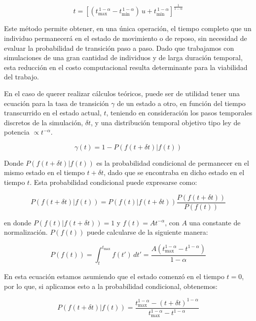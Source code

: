 \begin{equation}
    t = \left[(t_{\max}^{\,1-\alpha} - t_{\min}^{\,1-\alpha})\,u + t_{\min}^{\,1-\alpha}\right]^{\frac{1}{1-\alpha}}
\end{equation}

Este método permite obtener, en una única operación, el tiempo completo que un individuo permanecerá en el estado de movimiento o de reposo, sin necesidad 
de evaluar la probabilidad de transición paso a paso. Dado que trabajamos con simulaciones de una gran cantidad de individuos y de larga duración temporal, 
esta reducción en el costo computacional resulta determinante para la viabilidad del trabajo.

En el caso de querer realizar cálculos teóricos, puede ser de utilidad tener una ecuación para la tasa de transición $\gamma$ de un estado a otro, en función del 
tiempo transcurrido en el estado actual, $t$, teniendo en consideración los pasos temporales discretos de la simulación, $\delta t$, y una distribución 
temporal objetivo tipo ley de potencia $\propto t^{-\alpha}$.

\begin{equation}
    \gamma (t) = 1 - P(f(t+\delta t)|f(t))
\end{equation}

Donde $P(f(t+\delta t)|f(t))$ es la probabilidad condicional de permanecer en el mismo estado en el tiempo $t+\delta t$, dado que se encontraba en dicho 
estado en el tiempo $t$. Esta probabilidad condicional puede expresarse como:

\begin{equation}
    P(f(t+\delta t)|f(t)) = P(f(t)|f(t+\delta t))\frac{P(f(t+\delta t))}{P(f(t))}
\end{equation}

en donde $P(f(t)|f(t+\delta t))=1$ y $f(t)=A t^{-\alpha}$, con $A$ una constante de normalización. $P(f(t))$ puede calcularse de la siguiente manera:

\begin{equation}
    P(f(t))=\int_{t}^{t_{\text{max}}}f(t')\,dt'=\frac{A\left(t_{\text{max}}^{1-\alpha}-t^{1-\alpha}\right)}{1-\alpha}
\end{equation}

En esta ecuación estamos asumiendo que el estado comenzó en el tiempo $t=0$, por lo que, si aplicamos esto a la probabilidad condicional, obtenemos:

\begin{equation}
    P(f(t+\delta t)|f(t)) = \frac{t_{\text{max}}^{1-\alpha}-(t+\delta t)^{1-\alpha}}{t_{\text{max}}^{1-\alpha}-t^{1-\alpha}} 
\end{equation}

